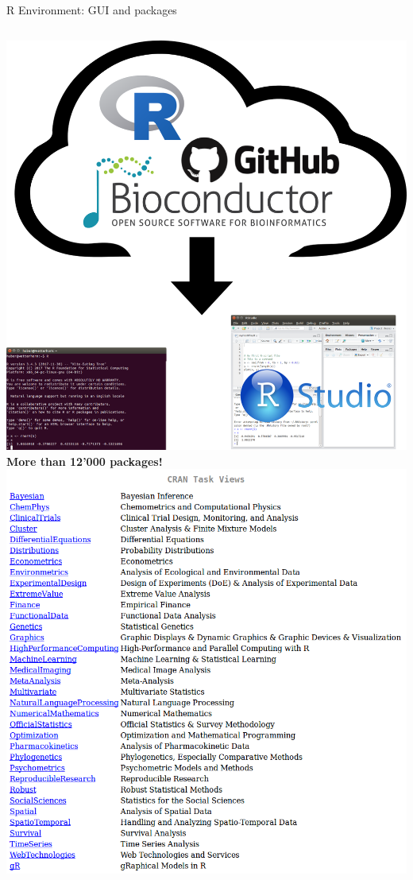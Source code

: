 \documentclass[8pt,ignorenonframetext,]{beamer}
\newcommand{\columnsbegin}{\begin{columns}}
\newcommand{\columnsend}{\end{columns}}
\begin{document}
\begin{frame}{R Environment: GUI and packages}

\columnsbegin
{} \includegraphics{imgPres/packages.png}
 \textbf{More than 12'000 packages!}
\includegraphics{imgPres/rcran-task-view.png} \columnsend

\end{frame}
\end{document}
